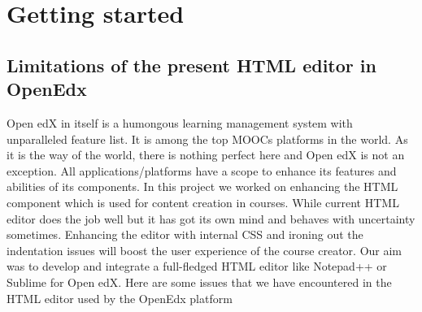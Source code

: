 \chapter{Getting started}
\section{Limitations of the present HTML editor in OpenEdx}
Open edX in itself is a humongous learning management system with unparalleled feature list. It is
among the top MOOCs platforms in the world. As it is the way of the world, there is nothing perfect
here and Open edX is not an exception. All applications/platforms have a scope to enhance its
features and abilities of its components. In this project we worked on enhancing the HTML
component which is used for content creation in courses.\newline\newline
While current HTML editor does the job well but it has got its own mind and behaves with
uncertainty sometimes. Enhancing the editor with internal CSS and ironing out the indentation
issues will boost the user experience of the course creator. Our aim was to develop and integrate a
full-fledged HTML editor like Notepad++ or Sublime for Open edX.\newline\newline
Here are some issues that we have encountered in the HTML editor used by the OpenEdx platform
